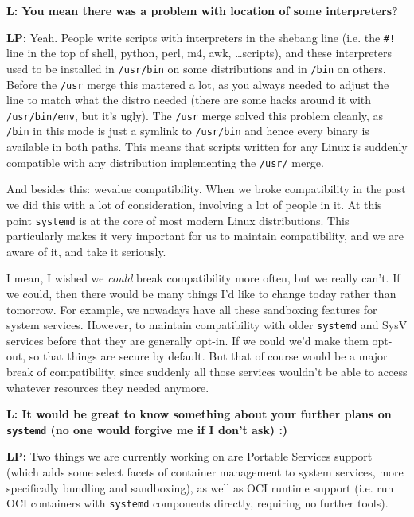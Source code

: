 \documentclass[10pt, a5paper]{article}
\begin{document}
\begin{Parallel}[p]{}{}
{{\noindent \bf L: You mean there was a problem with location of some interpreters?}

{\noindent \bf LP:} Yeah. People write scripts with interpreters in the shebang line (i.e. the \verb"#!" line in the top of shell, python, perl, m4, awk, \ldots scripts), and these interpreters used to be installed in \verb!/usr/bin! on some distributions and in \verb!/bin! on others. Before the \verb!/usr! merge this mattered a lot, as you always needed to adjust the line to match what the distro needed (there are some hacks around it with \verb!/usr/bin/env!, but it's ugly). The \verb!/usr! merge solved this problem cleanly, as \verb!/bin! in this mode is just a symlink to \verb!/usr/bin! and hence every binary is available in both paths. This means that scripts written for any Linux is suddenly compatible with any distribution implementing the \verb!/usr/! merge.

And besides this: wevalue compatibility. When we broke compatibility in the past we did this with a lot of consideration, involving a lot of people in it. At this point \verb!systemd! is at the core of most modern Linux distributions. This particularly makes it very important for us to maintain compatibility, and we are aware of it, and take it seriously.

I mean, I wished we \textit{could} break compatibility more often, but we really can't. If we could, then there would be many things I'd like to change today rather than tomorrow. For example, we nowadays have all these sandboxing features for system services. However, to maintain compatibility with older \verb!systemd! and SysV services before that they are generally opt-in. If we could we'd make them opt-out, so that things are secure by default. But that of course would be a major break of compatibility, since suddenly all those services wouldn't be able to access whatever resources they needed anymore.

{\noindent \bf L: It would be great to know something about your further plans on \verb!systemd! (no one would forgive me if I don't ask) :)}

{\noindent \bf LP:} Two things we are currently working on are Portable Services support (which adds some select facets of container management to system services, more specifically bundling and sandboxing), as well as OCI runtime support (i.e. run OCI containers with \verb!systemd! components directly, requiring no further tools).


\vfill
     }
\end{Parallel}
\end{document}
